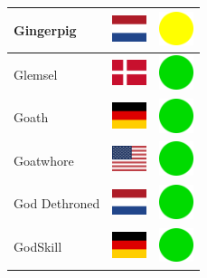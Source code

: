 \documentclass[12pt, a4paper, twoside]{report}
\begin{document}
\begin{center}
\begin{longtable}{|p{5cm}|p{2cm}|p{2cm}|}
Gingerpig & \includegraphics[width=1cm]{4x3/nl} & \includegraphics[width=1cm]{likes/m} \\ \hline
Glemsel & \includegraphics[width=1cm]{4x3/dk} & \includegraphics[width=1cm]{likes/y} \\ \hline
Goath & \includegraphics[width=1cm]{4x3/de} & \includegraphics[width=1cm]{likes/y} \\ \hline
Goatwhore & \includegraphics[width=1cm]{4x3/us} & \includegraphics[width=1cm]{likes/y} \\ \hline
God Dethroned & \includegraphics[width=1cm]{4x3/nl} & \includegraphics[width=1cm]{likes/y} \\ \hline
GodSkill & \includegraphics[width=1cm]{4x3/de} & \includegraphics[width=1cm]{likes/y} \\ \hline

\end{longtable}
\end{center}
\end{document}
